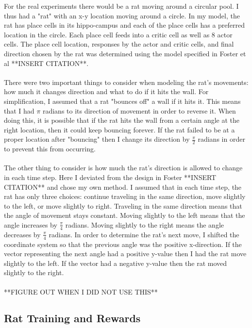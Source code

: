 \documentclass[conference]{IEEEtran}
\begin{document}
For the real experiments there would be a rat moving around a circular pool. I thus had a "rat" with an x-y location moving around a circle. In my model, the rat has place cells in its hippo-campus and each of the place cells has a preferred location in the circle. Each place cell feeds into a critic cell as well as 8 actor cells. The place cell location, responses by the actor and critic cells, and final direction chosen by the rat was determined using the model specified in Foster et al **INSERT CITATION**. \\
\\
There were two important things to consider when modeling the rat's movements: how much it changes direction and what to do if it hits the wall. For simplification, I assumed that a rat "bounces off" a wall if it hits it. This means that I had $\pi$ radians to its direction of movement in order to reverse it. When doing this, it is possible that if the rat hits the wall from a certain angle at the right location, then it could keep bouncing forever. If the rat failed to be at a proper location after "bouncing" then I change its direction by $\frac{\pi}{2}$ radians in order to prevent this from occurring. \\
\\
The other thing to consider is how much the rat's direction is allowed to change in each time step. Here I deviated from the design in Foster **INSERT CITATION** and chose my own method. I assumed that in each time step, the rat has only three choices: continue traveling in the same direction, move slightly to the left, or move slightly to right. Traveling in the same direction means that the angle of movement stays constant. Moving slightly to the left means that the angle increases by $\frac{\pi}{4}$ radians. Moving slightly to the right means the angle decreases by $\frac{\pi}{4}$ radians. In order to determine the rat's next move, I shifted the coordinate system so that the previous angle was the positive x-direction. If the vector representing the next angle had a positive y-value then I had the rat move slightly to the left. If the vector had a negative y-value then the rat moved slightly to the right.\\
\\
**FIGURE OUT WHEN I DID NOT USE THIS**

\subsection{Rat Training and Rewards}
\end{document}
